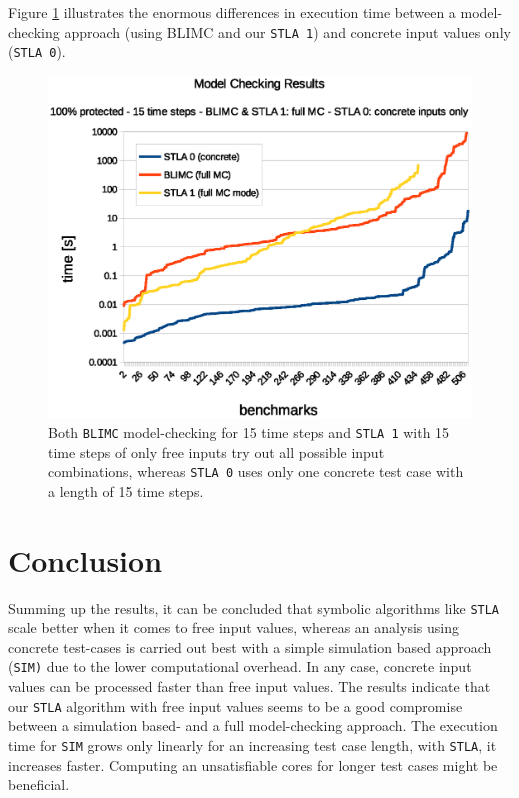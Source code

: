 \documentclass[a4paper,10pt]{article}
\begin{document}
Figure \ref{mc-chart} illustrates the enormous differences in execution time between a model-checking approach (using BLIMC and our \texttt{STLA 1}) and concrete input values only (\texttt{STLA 0}).


\begin{figure}[!htb]
\centering
\includegraphics[scale = 0.64]{img/mc.eps}
\centering \caption{Both \texttt{BLIMC} model-checking for 15 time steps and \texttt{STLA 1} with 15 time steps of only free inputs try out all possible input combinations, 
whereas \texttt{STLA 0} uses only one concrete test case with a length of 15 time steps. } 
\label{mc-chart}
\end{figure}

\newpage
\section{Conclusion}
Summing up the results, it can be concluded that symbolic algorithms like \texttt{STLA} scale better when it comes to free input values, whereas an analysis using concrete test-cases is carried out best with 
a simple simulation based approach (\texttt{SIM)} due to the lower computational overhead. In any case, concrete input values can be processed faster than free input values.
The results indicate that our \texttt{STLA} algorithm with free input values seems to be a good compromise between a simulation based- and a full model-checking approach.
The execution time for \texttt{SIM} grows only linearly for an increasing test case length, with \texttt{STLA}, it increases faster. Computing an unsatisfiable cores for longer test cases might be beneficial.
\end{document}
